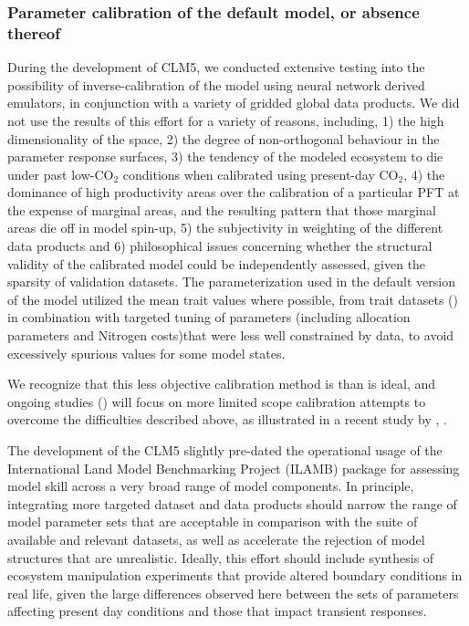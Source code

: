 \documentclass[draft,linenumbers]{agujournal}
\begin{document}
\subsubsection{Parameter calibration of the default model, or absence thereof}

During the development of CLM5, we conducted extensive testing into the possibility of inverse-calibration of the model using neural network derived emulators, in conjunction with a variety of gridded global data products. We did not use the results of this effort for a variety of reasons, including,  1) the high dimensionality of the space, 2) the degree of non-orthogonal behaviour in the parameter response surfaces,  3) the tendency of the modeled ecosystem to die under past low-CO$_{2}$ conditions when calibrated using present-day CO$_{2}$, 4) the dominance of high productivity areas over the calibration of a particular PFT at the expense of marginal areas, and the resulting pattern that those marginal areas die off in model spin-up, 5) the subjectivity in weighting of the different data products and 6) philosophical issues concerning whether the structural validity of the calibrated model could be independently assessed, given the sparsity of validation datasets. The parameterization used in the default version of the model utilized the mean trait values where possible, from trait datasets (\cite{lawrence2018}) in combination with targeted tuning of parameters   (including allocation parameters and Nitrogen costs)that were less well constrained by data, to avoid excessively spurious values for some model states.

We recognize that this less objective calibration method is than is ideal, and ongoing studies (\cite{dagon}) will focus on more limited scope calibration attempts to overcome the difficulties described above, as illustrated in a recent study by \cite{fer2018}, .  

The development of the CLM5 slightly pre-dated the operational usage of the International Land Model Benchmarking Project (ILAMB) package \cite{collier2016} for assessing model skill across a very broad range of model components.  In principle, integrating more targeted dataset and data products should narrow the range of model parameter sets that are acceptable in comparison with the suite of available and relevant datasets, as well as accelerate the rejection of model structures that are unrealistic. Ideally, this effort should include synthesis of ecosystem manipulation experiments that provide altered boundary conditions in real life, given the large differences observed here between the sets of parameters affecting present day conditions and those that impact transient responses.
\end{document}
